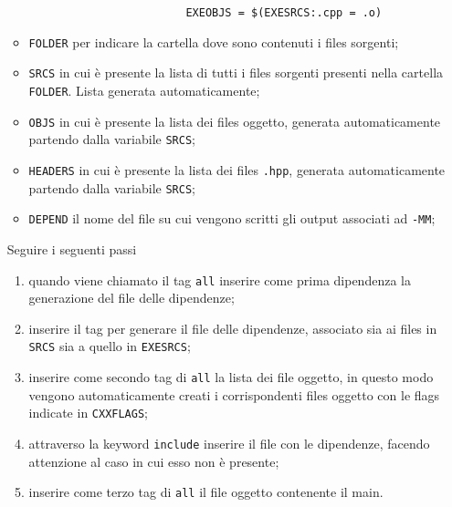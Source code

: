 \begin{enumerate}
\begin{itemize}
					\begin{verbatim}
						EXEOBJS = $(EXESRCS:.cpp = .o)
					\end{verbatim}
				\item \texttt{FOLDER} per indicare la cartella dove sono contenuti i files sorgenti;
				\item \texttt{SRCS} in cui \`e presente la lista di tutti i files sorgenti presenti nella cartella \texttt{FOLDER}. Lista generata automaticamente;
				\item \texttt{OBJS} in cui \`e presente la lista dei files oggetto, generata automaticamente partendo dalla variabile \texttt{SRCS};
				\item \texttt{HEADERS} in cui \`e presente la lista dei files \texttt{.hpp}, generata automaticamente partendo dalla variabile \texttt{SRCS};
				\item \texttt{DEPEND} il nome del file su cui vengono scritti gli output associati ad \texttt{-MM};
			\end{itemize}
			Seguire i seguenti passi
			\begin{enumerate}
				\item quando viene chiamato il tag \texttt{all} inserire come prima dipendenza la generazione del file delle dipendenze;
				\item inserire il tag per generare il file delle dipendenze, associato sia ai files in \texttt{SRCS} sia a quello in \texttt{EXESRCS};
				\item inserire come secondo tag di \texttt{all} la lista dei file oggetto, in questo modo vengono automaticamente creati i corrispondenti files oggetto con le flags indicate in \texttt{CXXFLAGS};
				\item attraverso la keyword \texttt{include} inserire il file con le dipendenze, facendo attenzione al caso in cui esso non \`e presente;
				\item inserire come terzo tag di \texttt{all} il file oggetto contenente il main.
			\end{enumerate}
		

\end{enumerate}
